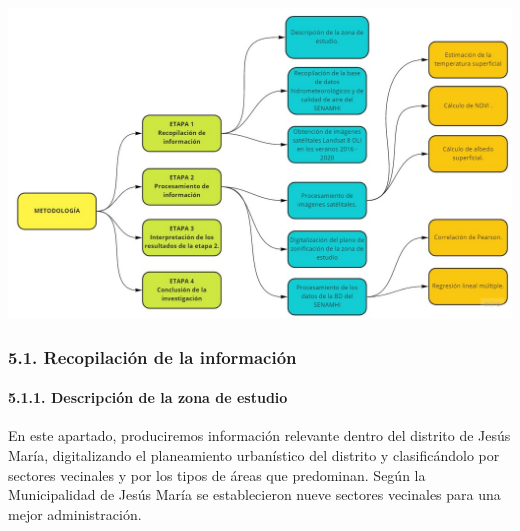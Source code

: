 \documentclass[
]{article}
\begin{document}
\begin{center}\includegraphics{Img/Metodologia} \end{center}

\hypertarget{recopilaciuxf3n-de-la-informaciuxf3n}{%
\subsubsection{5.1. Recopilación de la
información}\label{recopilaciuxf3n-de-la-informaciuxf3n}}

\hypertarget{descripciuxf3n-de-la-zona-de-estudio}{%
\paragraph{5.1.1. Descripción de la zona de
estudio}\label{descripciuxf3n-de-la-zona-de-estudio}}

En este apartado, produciremos información relevante dentro del distrito
de Jesús María, digitalizando el planeamiento urbanístico del distrito y
clasificándolo por sectores vecinales y por los tipos de áreas que
predominan. Según la Municipalidad de Jesús María se establecieron nueve
sectores vecinales para una mejor administración.
\end{document}
